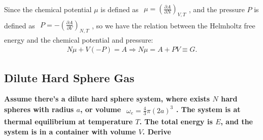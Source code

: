 \documentclass[../../main.tex]{subfiles}
\begin{document}
  Since the chemical potential $\mu$ is defined as $\begin{aligned}
    \mu = \left(\frac{\partial A}{\partial N}\right)_{V,T}
  \end{aligned}$, and the pressure $P$ is defined as $\begin{aligned}
    P = -\left(\frac{\partial A}{\partial V}\right)_{N,T}
  \end{aligned}$, so we have the relation between the Helmholtz free energy and the chemical potential and pressure:
  \begin{align*}
    N\mu + V(-P) = A\Rightarrow N\mu = A + PV \equiv G.
  \end{align*}

  \subsection{Dilute Hard Sphere Gas}
  \textbf{Assume there's a dilute hard sphere system, where exists $N$ hard spheres with radius $a$, or volume $\begin{aligned}
    \omega_{e} = \frac{4}{3}\pi (2a)^{3}
  \end{aligned}$.  The system is at thermal equilibrium at temperature $T$. The total energy is $E$, and the system is in a container with volume $V$. Derive}
\end{document}
